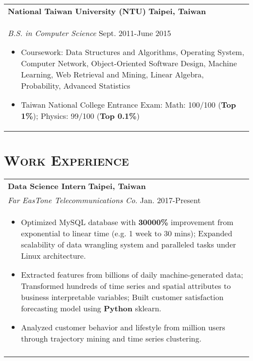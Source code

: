 \documentclass[a4paper,11pt]{article} %
\begin{document}
{\begin{tabular}{p{18.5cm}}
{\bf{National Taiwan University (NTU)}} \hfill \bf{Taipei, Taiwan}\\
{\it B.S. in Computer Science} \hfill Sept. 2011-June 2015
\begin{itemize}
\item Coursework: Data Structures and Algorithms, Operating System, Computer Network, Object-Oriented Software Design, Machine Learning, Web Retrieval and Mining, Linear Algebra, Probability, Advanced Statistics 
\item Taiwan National College Entrance Exam:  Math: 100/100 (\textbf{Top 1\%}); Physics: 99/100 (\textbf{Top 0.1\%})\vspace*{-\baselineskip}
\end{itemize} 
\end{tabular}

\section{\Large\bf\textsc{Work Experience}}
\begin{tabular}{p{18.5cm}}

{\bf{Data Science Intern}} \hfill \bf{Taipei, Taiwan}\\
{\it Far EasTone Telecommunications Co.} \hfill  Jan. 2017-Present\\%
\begin{itemize}
\vspace{-3mm}
\item Optimized MySQL database with {\bf30000\%} improvement from exponential to linear time (e.g. 1 week to 30 mins); Expanded scalability of data wrangling system and paralleled tasks under Linux architecture.
\item Extracted features from billions of daily machine-generated data; Transformed hundreds of time series and spatial attributes to business interpretable variables; Built customer satisfaction forecasting model using {\bf Python} sklearn. 
\item Analyzed customer behavior and lifestyle from million users through trajectory mining and time series clustering.\vspace*{-\baselineskip}
\end{itemize} \\ 
\vspace{.1mm}


\end{tabular}}
\end{document}
